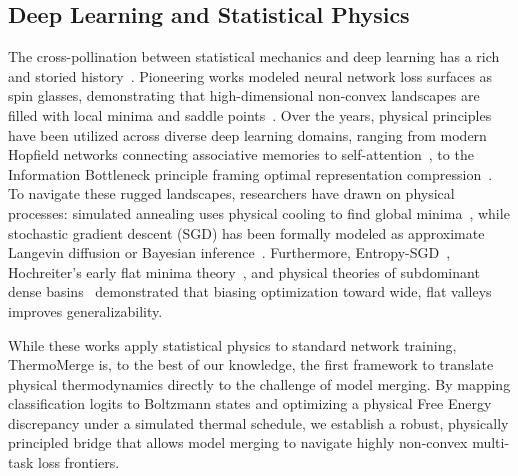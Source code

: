 \subsection{Deep Learning and Statistical Physics}
The cross-pollination between statistical mechanics and deep learning has a rich and storied history~\cite{carleo2019machine,bahri2020statistical}. Pioneering works modeled neural network loss surfaces as spin glasses, demonstrating that high-dimensional non-convex landscapes are filled with local minima and saddle points~\cite{mezard1987spin,choromanska2015loss}. Over the years, physical principles have been utilized across diverse deep learning domains, ranging from modern Hopfield networks connecting associative memories to self-attention~\cite{ramsauer2020hopfield}, to the Information Bottleneck principle framing optimal representation compression~\cite{tishby2015deep}. To navigate these rugged landscapes, researchers have drawn on physical processes: simulated annealing uses physical cooling to find global minima~\cite{kirkpatrick1983optimization}, while stochastic gradient descent (SGD) has been formally modeled as approximate Langevin diffusion or Bayesian inference~\cite{mandt2017stochastic}. Furthermore, Entropy-SGD~\cite{chaudhari2019entropy}, Hochreiter's early flat minima theory~\cite{hochreiter1997flat}, and physical theories of subdominant dense basins~\cite{baldassi2015subdominant} demonstrated that biasing optimization toward wide, flat valleys improves generalizability. 

While these works apply statistical physics to standard network training, ThermoMerge is, to the best of our knowledge, the first framework to translate physical thermodynamics directly to the challenge of model merging. By mapping classification logits to Boltzmann states and optimizing a physical Free Energy discrepancy under a simulated thermal schedule, we establish a robust, physically principled bridge that allows model merging to navigate highly non-convex multi-task loss frontiers.
